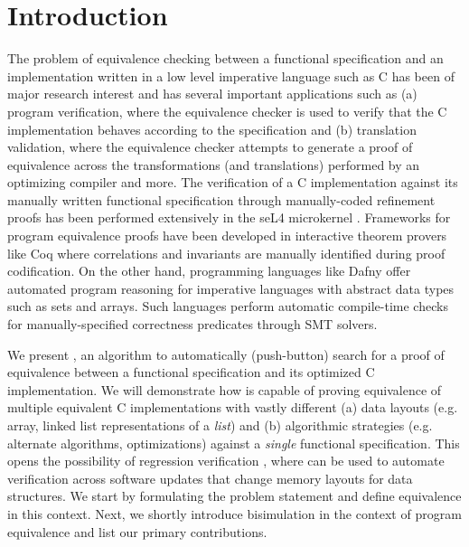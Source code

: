 \vspace{-7px}
\section{Introduction}
\label{sec:syn-intro}
\vspace{-7px}
The problem of equivalence checking between a functional specification and an
implementation written in a low level imperative language such as C
has been of major research interest
and has several important applications such as (a) program verification, where
the equivalence checker is used to verify that the C implementation
behaves according to the specification and (b) translation validation, where
the equivalence checker attempts to generate a proof of equivalence across
the transformations (and translations) performed by an optimizing compiler
and more. The verification of a C implementation against its manually written
functional specification through manually-coded refinement proofs has been
performed extensively in the seL4 microkernel \cite{seL4}.
Frameworks for program equivalence proofs have been developed in interactive
theorem provers like Coq \cite{programEquivalenceInCoq} where correlations and invariants
are manually identified during proof codification.
On the other hand, programming languages like Dafny \cite{dafny} offer automated program
reasoning for imperative languages with abstract data types such as sets and arrays.
Such languages perform automatic compile-time checks for manually-specified correctness predicates through
SMT solvers.

We present \toolName{}, an algorithm to automatically (push-button) search
for a proof of equivalence between a functional specification and its
optimized C implementation. We will demonstrate how \toolName{} is capable of
proving equivalence of multiple equivalent C implementations with vastly
different (a) data layouts (e.g. array, linked list representations of a {\em list})
and (b) algorithmic strategies (e.g. alternate algorithms, optimizations) against
a {\em single} functional specification.
This opens the possibility of regression verification \cite{strichman_regressverify,felsing14},
where \toolName{} can be used to automate verification across
software updates that change memory layouts for data structures.
We start by formulating the problem statement and define equivalence in this context.
Next, we shortly introduce bisimulation in the context of program equivalence and list our primary contributions.
\vspace{-7px}
